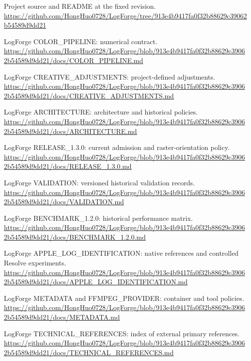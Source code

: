 \documentclass[11pt,a4paper,openany]{book}
\begin{document}
\par [1] Project source and README at the fixed revision. \url{https://github.com/HongHuo0728/LogForge/tree/913e4b9417fa0f32b88629c39062b54589d9dd21}\par
\par [2] LogForge COLOR\_PIPELINE: numerical contract. \url{https://github.com/HongHuo0728/LogForge/blob/913e4b9417fa0f32b88629c39062b54589d9dd21/docs/COLOR_PIPELINE.md}\par
\par [3] LogForge CREATIVE\_ADJUSTMENTS: project-defined adjustments. \url{https://github.com/HongHuo0728/LogForge/blob/913e4b9417fa0f32b88629c39062b54589d9dd21/docs/CREATIVE_ADJUSTMENTS.md}\par
\par [4] LogForge ARCHITECTURE: architecture and historical policies. \url{https://github.com/HongHuo0728/LogForge/blob/913e4b9417fa0f32b88629c39062b54589d9dd21/docs/ARCHITECTURE.md}\par
\par [5] LogForge RELEASE\_1.3.0: current admission and raster-orientation policy. \url{https://github.com/HongHuo0728/LogForge/blob/913e4b9417fa0f32b88629c39062b54589d9dd21/docs/RELEASE_1.3.0.md}\par
\par [6] LogForge VALIDATION: versioned historical validation records. \url{https://github.com/HongHuo0728/LogForge/blob/913e4b9417fa0f32b88629c39062b54589d9dd21/docs/VALIDATION.md}\par
\par [7] LogForge BENCHMARK\_1.2.0: historical performance matrix. \url{https://github.com/HongHuo0728/LogForge/blob/913e4b9417fa0f32b88629c39062b54589d9dd21/docs/BENCHMARK_1.2.0.md}\par
\par [8] LogForge APPLE\_LOG\_IDENTIFICATION: native references and controlled Resolve experiments. \url{https://github.com/HongHuo0728/LogForge/blob/913e4b9417fa0f32b88629c39062b54589d9dd21/docs/APPLE_LOG_IDENTIFICATION.md}\par
\par [9] LogForge METADATA and FFMPEG\_PROVIDER: container and tool policies. \url{https://github.com/HongHuo0728/LogForge/blob/913e4b9417fa0f32b88629c39062b54589d9dd21/docs/METADATA.md}\par
\par [10] LogForge TECHNICAL\_REFERENCES: index of external primary references. \url{https://github.com/HongHuo0728/LogForge/blob/913e4b9417fa0f32b88629c39062b54589d9dd21/docs/TECHNICAL_REFERENCES.md}\par
\end{document}
